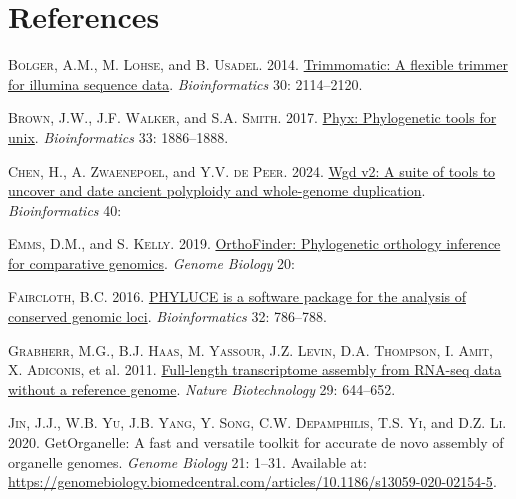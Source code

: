 \documentclass[
  12pt,
]{article}
\newlength{\cslhangindent}
\newlength{\cslentryspacingunit} %
\newenvironment{CSLReferences}[2] %
 {%
  \setlength{\parindent}{0pt}
  \ifodd #1
  \let\oldpar\par
  \def\par{\hangindent=\cslhangindent\oldpar}
  \fi
  \setlength{\parskip}{#2\cslentryspacingunit}
 }%
 {}
\begin{document}
\hypertarget{references}{%
\section{References}\label{references}}

\hypertarget{refs}{}
\begin{CSLReferences}{1}{0}
\leavevmode{}%
\textsc{Bolger, A.M.}, \textsc{M. Lohse}, and \textsc{B. Usadel}. 2014. \href{https://doi.org/10.1093/BIOINFORMATICS/BTU170}{Trimmomatic: A flexible trimmer for illumina sequence data}. \emph{Bioinformatics} 30: 2114--2120.

\leavevmode{}%
\textsc{Brown, J.W.}, \textsc{J.F. Walker}, and \textsc{S.A. Smith}. 2017. \href{https://doi.org/10.1093/bioinformatics/btx063}{Phyx: Phylogenetic tools for unix}. \emph{Bioinformatics} 33: 1886--1888.

\leavevmode{}%
\textsc{Chen, H.}, \textsc{A. Zwaenepoel}, and \textsc{Y.V. de Peer}. 2024. \href{https://doi.org/10.1093/bioinformatics/btae272}{Wgd v2: A suite of tools to uncover and date ancient polyploidy and whole-genome duplication}. \emph{Bioinformatics} 40:

\leavevmode{}%
\textsc{Emms, D.M.}, and \textsc{S. Kelly}. 2019. \href{https://doi.org/10.1186/s13059-019-1832-y}{OrthoFinder: Phylogenetic orthology inference for comparative genomics}. \emph{Genome Biology} 20:

\leavevmode{}%
\textsc{Faircloth, B.C.} 2016. \href{https://doi.org/10.1093/bioinformatics/btv646}{PHYLUCE is a software package for the analysis of conserved genomic loci}. \emph{Bioinformatics} 32: 786--788.

\leavevmode{}%
\textsc{Grabherr, M.G.}, \textsc{B.J. Haas}, \textsc{M. Yassour}, \textsc{J.Z. Levin}, \textsc{D.A. Thompson}, \textsc{I. Amit}, \textsc{X. Adiconis}, et al. 2011. \href{https://doi.org/10.1038/nbt.1883}{Full-length transcriptome assembly from RNA-seq data without a reference genome}. \emph{Nature Biotechnology} 29: 644--652.

\leavevmode{}%
\textsc{Jin, J.J.}, \textsc{W.B. Yu}, \textsc{J.B. Yang}, \textsc{Y. Song}, \textsc{C.W. Depamphilis}, \textsc{T.S. Yi}, and \textsc{D.Z. Li}. 2020. GetOrganelle: A fast and versatile toolkit for accurate de novo assembly of organelle genomes. \emph{Genome Biology} 21: 1--31. Available at: \url{https://genomebiology.biomedcentral.com/articles/10.1186/s13059-020-02154-5}.


\end{CSLReferences}
\end{document}
